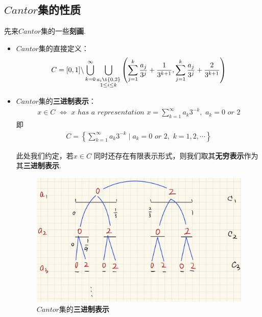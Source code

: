 \newpage

\subsection{$Cantor$集的性质}
	先来$Cantor$集的一些\textbf{刻画}.
	
	\vspace*{1em}
	\begin{itemize}
		\item $Cantor$集的直接定义：
		\begin{align}
			C = [0 , 1] \backslash \bigcup_{k = 0}^{\infty} \bigcup_{\substack{a_i \i \{ 0 , 2 \} \\ 1 \leq i \leq k}} \left( \sum_{j = 1}^{k}{\frac{a_j}{3^j}} + \frac{1}{3^{k + 1}} , \sum_{j = 1}^{k}{\frac{a_j}{3^j}} + \frac{2}{3^{k + 1}} \right)
		\end{align}
		
		\vspace*{6em}
		
		\item $Cantor$集的\textbf{三进制表示}：
		\begin{align}
			x \in C \,\, \Leftrightarrow \,\, x \,\, has \,\, a \,\, representation \,\, x = \sum_{k = 1}^{\infty}{a_k 3^{-k}} , \,\, a_k = 0 \,\, or \,\, 2
		\end{align}
		即
		\begin{align}
			C = \left\{ \sum_{k = 1}^{\infty}{a_k 3^{-k}} \mid a_k = 0 \,\, or \,\, 2 , \,\, k = 1 , 2 , \cdots \right\}
		\end{align}
	
		\begin{rmk}
			此处我们约定，若$x \in C$ 同时还存在有限表示形式，则我们取其\textbf{无穷表示}作为其\textbf{三进制表示}.
		\end{rmk}
	
		\begin{figure}[thbp!]
			\centering
			\includegraphics[width=0.7\linewidth]{figure/Cantor-1}
			\caption{$Cantor$集的\textbf{三进制表示}}
			\label{pic : Cantor} %
		\end{figure}
	\end{itemize}
	
